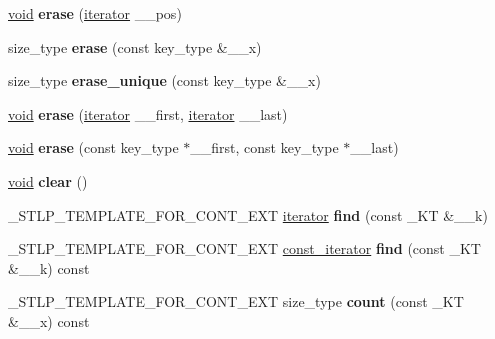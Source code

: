 \begin{DoxyCompactItemize}
\hyperlink{interfacevoid}{void} {\bfseries erase} (\hyperlink{struct___rb__tree__iterator}{iterator} \+\_\+\+\_\+pos)
\item 
\mbox{\label{class___rb__tree_ab8df439a948f8f5639c085762bdf2455}} 
size\+\_\+type {\bfseries erase} (const key\+\_\+type \&\+\_\+\+\_\+x)
\item 
\mbox{\label{class___rb__tree_aafe958b5bcca96f3998bffe2857e71a0}} 
size\+\_\+type {\bfseries erase\+\_\+unique} (const key\+\_\+type \&\+\_\+\+\_\+x)
\item 
\mbox{\label{class___rb__tree_a48cc43832ff42eb33c3e86672f55ca50}} 
\hyperlink{interfacevoid}{void} {\bfseries erase} (\hyperlink{struct___rb__tree__iterator}{iterator} \+\_\+\+\_\+first, \hyperlink{struct___rb__tree__iterator}{iterator} \+\_\+\+\_\+last)
\item 
\mbox{\label{class___rb__tree_a43e8dc76a7b15275154fa8100c7a653b}} 
\hyperlink{interfacevoid}{void} {\bfseries erase} (const key\+\_\+type $\ast$\+\_\+\+\_\+first, const key\+\_\+type $\ast$\+\_\+\+\_\+last)
\item 
\mbox{\label{class___rb__tree_a20d7c9bd64c1e0b67381c0f038c28b2d}} 
\hyperlink{interfacevoid}{void} {\bfseries clear} ()
\item 
\mbox{\label{class___rb__tree_a3714dcaf12c53e2b4b4a847c519090cd}} 
\+\_\+\+S\+T\+L\+P\+\_\+\+T\+E\+M\+P\+L\+A\+T\+E\+\_\+\+F\+O\+R\+\_\+\+C\+O\+N\+T\+\_\+\+E\+XT \hyperlink{struct___rb__tree__iterator}{iterator} {\bfseries find} (const \+\_\+\+KT \&\+\_\+\+\_\+k)
\item 
\mbox{\label{class___rb__tree_a5bf5224e2d3a3286161fb132329d12b6}} 
\+\_\+\+S\+T\+L\+P\+\_\+\+T\+E\+M\+P\+L\+A\+T\+E\+\_\+\+F\+O\+R\+\_\+\+C\+O\+N\+T\+\_\+\+E\+XT \hyperlink{struct___rb__tree__iterator}{const\+\_\+iterator} {\bfseries find} (const \+\_\+\+KT \&\+\_\+\+\_\+k) const
\item 
\mbox{\label{class___rb__tree_a504ae60eaffe045a9a33d7b537e0d396}} 
\+\_\+\+S\+T\+L\+P\+\_\+\+T\+E\+M\+P\+L\+A\+T\+E\+\_\+\+F\+O\+R\+\_\+\+C\+O\+N\+T\+\_\+\+E\+XT size\+\_\+type {\bfseries count} (const \+\_\+\+KT \&\+\_\+\+\_\+x) const

\end{DoxyCompactItemize}

